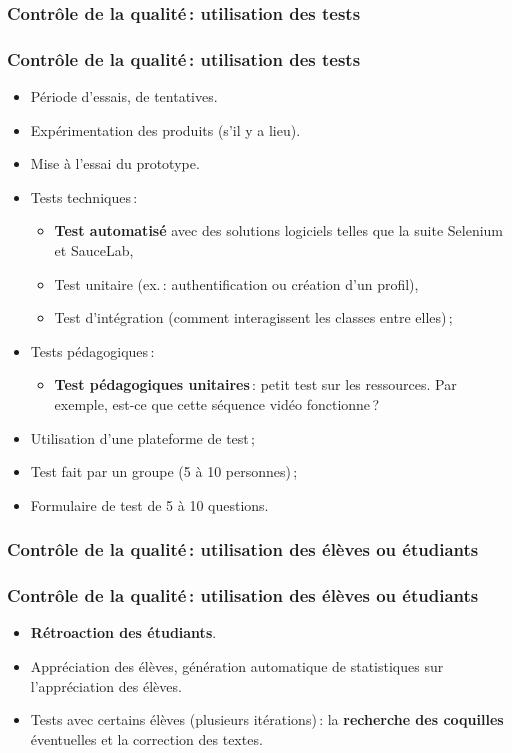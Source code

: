 					\subsubsection{Contrôle de la qualité\,: utilisation des tests} 
							\begin{frame}
							\frametitle{Contrôle de la qualité\,: utilisation des tests}
                        			
							\begin{itemize}
							\item Période d’essais, de tentatives.
							\item Expérimentation des produits (s’il y a lieu).
							\item Mise à l’essai du  prototype.
							\item Tests techniques\,:
								\begin{itemize}
								\item \textbf{Test automatisé } avec des solutions logiciels telles que la suite Selenium et SauceLab,
								\item Test unitaire (ex.\,: authentification ou création d’un profil),
								\item Test d’intégration (comment interagissent les classes entre elles)\,;
								\end{itemize}
							\item Tests pédagogiques\,:
								\begin{itemize}
								\item \textbf{Test pédagogiques unitaires}\,:  petit test sur les ressources. Par exemple, est-ce que cette séquence vidéo fonctionne\,?
								\end{itemize}
							\item Utilisation d’une plateforme de test\,;
							\item Test fait par un groupe (5 à 10 personnes)\,;
							\item Formulaire de test de 5 à 10 questions.
							\end{itemize}						
					\end{frame}
						
					\subsubsection{Contrôle de la qualité\,: utilisation des élèves ou étudiants} 
							\begin{frame}
							\frametitle{Contrôle de la qualité\,: utilisation des élèves ou étudiants}
                        			
							\begin{itemize}
							
							\item \textbf{Rétroaction des étudiants}.
							\item Appréciation des élèves, génération automatique de statistiques sur l’appréciation des élèves.
							\item Tests avec certains élèves (plusieurs itérations)\,: la \textbf{recherche des coquilles }éventuelles et la correction des textes.										
							\end{itemize}						
					\end{frame}	
					
